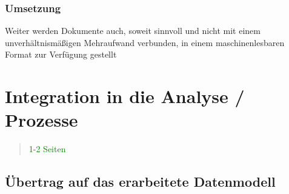        \subsubsection{Umsetzung}

Weiter werden Dokumente auch, soweit sinnvoll und nicht mit einem unverhältnismäßigen Mehraufwand verbunden, in einem maschinenlesbaren Format zur Verfügung gestellt \cite[Art. 8 Abs. 1f]{2011D0833}







        \pagebreak
    
    \section{Integration in die Analyse / Prozesse}
    
\begin{quote}
\textcolor{green}{1-2 Seiten}
\end{quote}

\subsection{Übertrag auf das erarbeitete Datenmodell}
\pagebreak